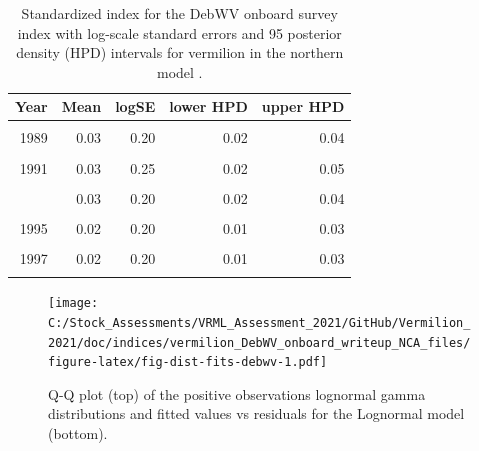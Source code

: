\documentclass[
  english,
  a4paper,
]{article}
\begin{document}
\FloatBarrier

\begin{table}

\caption{\label{tab:tab-index-debwv}Standardized index for the DebWV onboard survey index with log-scale standard errors and 95%
       posterior density (HPD) intervals for vermilion in the northern model .}
\centering
\begin{tabular}[t]{rrrrr}
\toprule
Year & Mean & logSE & lower HPD & upper HPD\\
\midrule
\cellcolor{gray!6}{1988} & \cellcolor{gray!6}{0.02} & \cellcolor{gray!6}{0.22} & \cellcolor{gray!6}{0.01} & \cellcolor{gray!6}{0.03}\\
1989 & 0.03 & 0.20 & 0.02 & 0.04\\
\cellcolor{gray!6}{1990} & \cellcolor{gray!6}{0.06} & \cellcolor{gray!6}{0.23} & \cellcolor{gray!6}{0.04} & \cellcolor{gray!6}{0.10}\\
1991 & 0.03 & 0.25 & 0.02 & 0.05\\
\cellcolor{gray!6}{1992} & \cellcolor{gray!6}{0.02} & \cellcolor{gray!6}{0.20} & \cellcolor{gray!6}{0.01} & \cellcolor{gray!6}{0.03}\\
\addlinespace
1993 & 0.03 & 0.20 & 0.02 & 0.04\\
\cellcolor{gray!6}{1994} & \cellcolor{gray!6}{0.02} & \cellcolor{gray!6}{0.20} & \cellcolor{gray!6}{0.01} & \cellcolor{gray!6}{0.03}\\
1995 & 0.02 & 0.20 & 0.01 & 0.03\\
\cellcolor{gray!6}{1996} & \cellcolor{gray!6}{0.02} & \cellcolor{gray!6}{0.20} & \cellcolor{gray!6}{0.01} & \cellcolor{gray!6}{0.02}\\
1997 & 0.02 & 0.20 & 0.01 & 0.03\\
\addlinespace
\cellcolor{gray!6}{1998} & \cellcolor{gray!6}{0.02} & \cellcolor{gray!6}{0.20} & \cellcolor{gray!6}{0.01} & \cellcolor{gray!6}{0.03}\\
\bottomrule
\end{tabular}
\end{table}

\FloatBarrier

\begin{figure}
\centering
\texttt{[image: C:/Stock\_Assessments/VRML\_Assessment\_2021/GitHub/Vermilion\_2021/doc/indices/vermilion\_DebWV\_onboard\_writeup\_NCA\_files/figure-latex/fig-dist-fits-debwv-1.pdf]}
\caption{\label{fig:fig-dist-fits-debwv}Q-Q plot (top) of the positive observations lognormal gamma distributions and fitted values vs residuals for the Lognormal model (bottom).}
\end{figure}
\end{document}
